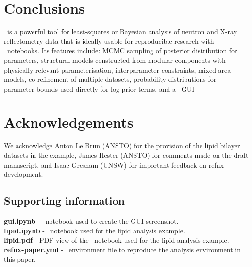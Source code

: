 \documentclass[12pt]{article}
\begin{document}
\section*{Conclusions}\label{conclusions}
\ is a powerful tool for least-squares or Bayesian analysis of neutron and X-ray reflectometry data that is ideally usable for reproducible research with \Jupyter\ notebooks. Its features include: MCMC sampling of posterior distribution for parameters, structural models constructed from modular components with physically relevant parameterisation, interparameter constraints, mixed area models, co-refinement of multiple datasets, probability distributions for parameter bounds used directly for log-prior terms, and a \Jupyter\/\ipywidgets\ GUI

\section*{Acknowledgements}
We acknowledge Anton Le Brun (ANSTO) for the provision of the lipid bilayer datasets in the example, James Hester (ANSTO) for comments made on the draft manuscript, and Isaac Gresham (UNSW) for important feedback on refnx development.

\subsection*{Supporting information}
\textbf{gui.ipynb} - \Jupyter\ notebook used to create the GUI screenshot.\\
\textbf{lipid.ipynb} - \Jupyter\ notebook used for the lipid analysis example.\\
\textbf{lipid.pdf} - PDF view of the \Jupyter\ notebook used for the lipid analysis example.\\
\textbf{refnx-paper.yml} - \conda\ environment file to reproduce the analysis environment in this paper.

{}

\end{document}
